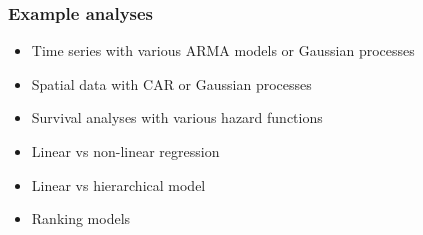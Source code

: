 \documentclass[english,t]{beamer}
\begin{document}
\begin{frame}
  \frametitle{Example analyses}

  \begin{itemize}
  \item Time series with various ARMA models or  Gaussian processes
  \item Spatial data with CAR or Gaussian processes
  \item Survival analyses with various hazard functions
  \item Linear vs non-linear regression
  \item Linear vs hierarchical model
  \item Ranking models
  \end{itemize}
  
\end{frame}
\end{document}
